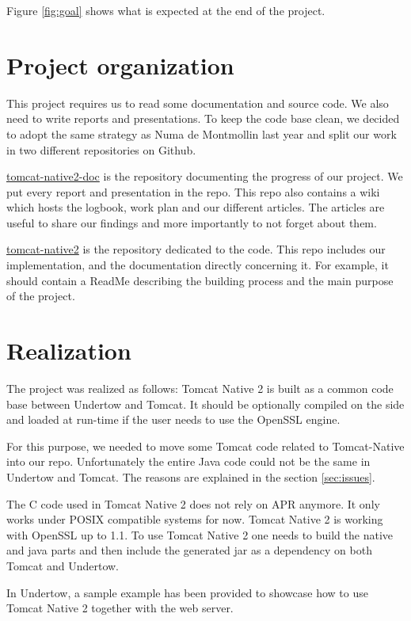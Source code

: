 \documentclass[11pt,a4paper,bibliography=totocnumbered]{scrartcl}
\def\mytitle{Tomcat Native 2}
\begin{document}
Figure \ref{fig:goal} shows what is expected at the end of the project.

\section{Project organization}
\label{sec:org}

This project requires us to read some documentation and source code. We also need to write reports and presentations. To keep the code base clean, we decided to adopt the same strategy as Numa de Montmollin last year and split our work in two different repositories on Github.

\href{https://github.com/jocelynthode/tomcat-native2-doc}{tomcat-native2-doc} is the repository documenting the progress of our project. We put every report and presentation in the repo. This repo also contains a wiki which hosts the logbook, work plan and our different articles. The articles are useful to share our findings and more importantly to not forget about them.

\href{https://github.com/jocelynthode/tomcat-native2}{tomcat-native2} is the repository dedicated to the code. This repo includes our implementation, and the documentation directly concerning it. For example, it should contain a ReadMe describing the building process and the main purpose of the project.

\section{Realization}
The project was realized as follows: \mytitle{} is built as a common code base between Undertow and Tomcat. It should be optionally compiled on the side and loaded at run-time if the user needs to use the OpenSSL engine.

For this purpose, we needed to move some Tomcat code related to Tomcat-Native into our repo. Unfortunately the entire Java code could not be the same in Undertow and Tomcat. The reasons are explained in the section \ref{sec:issues}.

The C code used in \mytitle{} does not rely on APR anymore. It only works under POSIX compatible systems for now. \mytitle{} is working with OpenSSL up to 1.1. To use \mytitle{} one needs to build the native and java parts and then include the generated jar as a dependency on both Tomcat and Undertow.

In Undertow, a sample example has been provided to showcase how to use \mytitle{} together with the web server.
\end{document}

